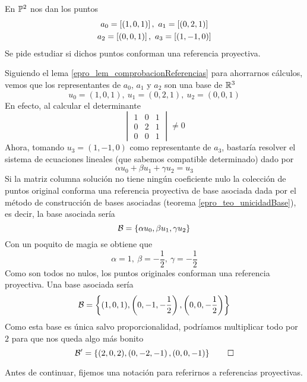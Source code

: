 \begin{exa}
	\label{epro_exa_basesAsociadas}
	En $\mathbb{P}^2$ nos dan los puntos \begin{gather*}a_0=\class{(1,0,1)},\ a_1=\class{(0,2,1)}\\a_2=\class{(0,0,1)},\ a_3=\class{(1,-1,0)}
	\end{gather*}
	Se pide estudiar si dichos puntos conforman una referencia proyectiva.
	
	Siguiendo el lema \ref{epro_lem_comprobacionReferencias} para ahorrarnos cálculos, vemos que los representantes de $a_0$, $a_1$ y $a_2$ son una base de $\mathbb{R}^3$
		\begin{equation*}
		u_0=(1,0,1),\ u_1=(0,2,1),\ u_2=(0,0,1)
		\end{equation*}
	En efecto, al calcular el determinante
	\[\begin{vmatrix}
	1 & 0 & 1\\
	0 & 2 & 1\\
	0 & 0 & 1
	\end{vmatrix}\not= 0\]
	Ahora, tomando $u_3=(1,-1,0)$ como representante de $a_3$, bastaría resolver el sistema de ecuaciones lineales (que sabemos compatible determinado) dado por
	\begin{equation*}
		\alpha u_0+\beta u_1 + \gamma u_2 = u_3
	\end{equation*}
	Si la matriz columna solución no tiene ningún coeficiente nulo la colección de puntos original conforma una referencia proyectiva de base asociada dada por el método de construcción de bases asociadas (teorema \ref{epro_teo_unicidadBase}), es decir, la base asociada sería\begin{equation*}
		\mathcal{B}=\{\alpha u_0,\beta u_1, \gamma u_2\}
	\end{equation*}
	Con un poquito de magia se obtiene que\begin{equation*}
		\alpha = 1,\ \beta = -\frac{1}{2},\ \gamma = -\frac{1}{2}
	\end{equation*}
	Como son todos no nulos, los puntos originales conforman una referencia proyectiva. Una base asociada sería
	\begin{equation*}
		\mathcal{B}=\left\{(1,0,1), \left(0,-1,-\frac{1}{2}\right),\left(0,0,-\frac{1}{2}\right)\right\}
	\end{equation*}
	Como esta base es única salvo proporcionalidad, podríamos multiplicar todo por $2$ para que nos queda algo más bonito
	\begin{equation*}
		\mathcal{B}'=\left\{(2,0,2), \left(0,-2,-1\right),\left(0,0,-1\right)\right\}\qedhere
	\end{equation*}
\end{exa}
Antes de continuar, fijemos una notación para referirnos a referencias proyectivas.

